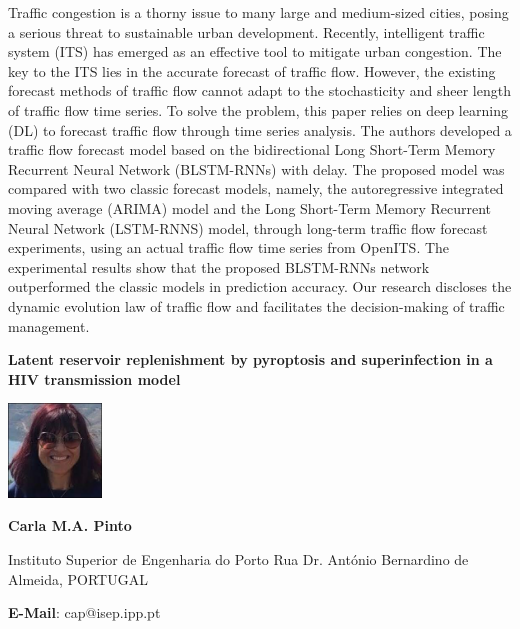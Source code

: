\documentclass[twoside,11pt]{amsart}
\begin{document}
Traffic congestion is a thorny issue to many large and medium-sized cities, posing a serious threat to sustainable urban development. Recently, intelligent traffic system (ITS) has emerged as an effective tool to mitigate urban congestion. The key to the ITS lies in the accurate forecast of traffic flow. However, the existing forecast methods of traffic flow cannot adapt to the stochasticity and sheer length of traffic flow time series. To solve the problem, this paper relies on deep learning (DL) to forecast traffic flow through time series analysis. The authors developed a traffic flow forecast model based on the bidirectional Long Short-Term Memory Recurrent Neural Network (BLSTM-RNNs) with delay. The proposed model was compared with two classic forecast models, namely, the autoregressive integrated moving average (ARIMA) model and the Long Short-Term Memory Recurrent Neural Network (LSTM-RNNS) model, through long-term traffic flow forecast experiments, using an actual traffic flow time series from OpenITS. The experimental results show that the proposed BLSTM-RNNs network outperformed the classic models in prediction accuracy. Our research discloses the dynamic evolution law of traffic flow and facilitates the decision-making of traffic management.
\vskip 5mm
\newpage
\vskip 10mm
\begin{center}\bf\LARGE
Latent reservoir replenishment by pyroptosis and superinfection in a HIV transmission model
\end{center}
\vskip 5mm
\begin{center}
\includegraphics[width=2.5cm, height=2.5cm, keepaspectratio=false]{CMA2.jpg}
\end{center}
\vskip 2mm

\centerline{\textbf{  Carla M.A. Pinto }}
\vskip 2mm
\begin{flushleft}
Instituto Superior de Engenharia do Porto Rua Dr. António Bernardino de Almeida, PORTUGAL
\end{flushleft}
\vskip 2mm
\begin{flushleft}
\textbf{E-Mail}: cap@isep.ipp.pt
\end{flushleft}
\end{document}
